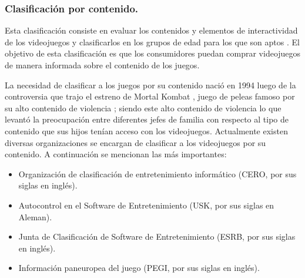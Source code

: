 		\subsubsection{Clasificación por contenido.}
			Esta clasificación consiste en evaluar los contenidos y elementos de
			 interactividad de los videojuegos y clasificarlos en los grupos de edad 
			 para los que son aptos \cite{RefESRB}. El objetivo de esta clasificación es 
			 que los consumidores puedan comprar videojuegos de manera informada sobre 
			 el contenido de los juegos.                  
             \\
             \par                    
             La necesidad de clasificar a los juegos por su contenido nació en 1994 
             luego de la controversia que trajo el estreno de Mortal Kombat
             \textregistered, juego de peleas famoso por su alto contenido de violencia 
             \cite{RefClasificacion}; siendo este alto contenido de violencia 
             lo que levantó la preocupación entre diferentes jefes de familia 
             con respecto al tipo de contenido que sus hijos tenían acceso con 
             los videojuegos. Actualmente existen diversas organizaciones 
             se encargan de clasificar a los videojuegos por su contenido. A 
             continuación se mencionan las más importantes:
                        
                        \begin{itemize}
                                \item Organización de clasificación de entretenimiento
                                 informático (CERO, por sus siglas en inglés).
                                \item Autocontrol en el Software de Entretenimiento 
                                (USK, por sus siglas en Aleman).
                                \item Junta de Clasificación de Software de 
                                Entretenimiento (ESRB, por sus siglas en inglés).
                                \item Información paneuropea del juego (PEGI, por sus 
                                siglas en inglés).
                        \end{itemize}                     
                
